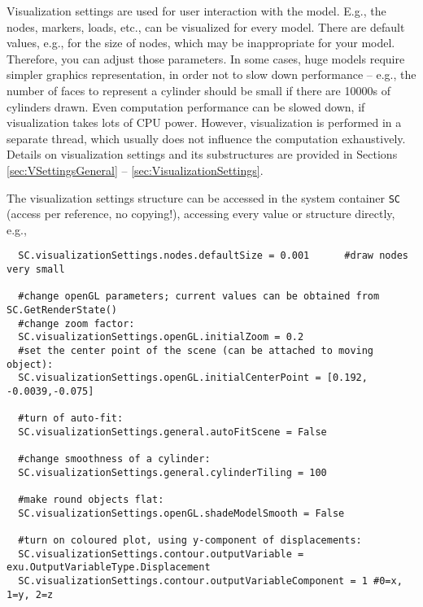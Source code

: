 %
Visualization settings are used for user interaction with the model. E.g., the nodes, markers, loads, etc., can be visualized for every model. There are default values, e.g., for the size of nodes, which may be inappropriate for your model. Therefore, you can adjust those parameters. In some cases, huge models require simpler graphics representation, in order not to slow down performance -- e.g., the number of faces to represent a cylinder should be small if there are 10000s of cylinders drawn. Even computation performance can be slowed down, if visualization takes lots of CPU power. However, visualization is performed in a separate thread, which usually does not influence the computation exhaustively.
Details on visualization settings and its substructures are provided in Sections \ref{sec:VSettingsGeneral} -- \ref{sec:VisualizationSettings}.

The visualization settings structure can be accessed in the system container \texttt{SC} (access per reference, no copying!), accessing every value or structure directly, e.g.,
\pythonstyle\begin{lstlisting}
  SC.visualizationSettings.nodes.defaultSize = 0.001      #draw nodes very small

  #change openGL parameters; current values can be obtained from SC.GetRenderState()
  #change zoom factor:
  SC.visualizationSettings.openGL.initialZoom = 0.2       
  #set the center point of the scene (can be attached to moving object):
  SC.visualizationSettings.openGL.initialCenterPoint = [0.192, -0.0039,-0.075]

  #turn of auto-fit:
  SC.visualizationSettings.general.autoFitScene = False

  #change smoothness of a cylinder:
  SC.visualizationSettings.general.cylinderTiling = 100
  
  #make round objects flat:
  SC.visualizationSettings.openGL.shadeModelSmooth = False

  #turn on coloured plot, using y-component of displacements:
  SC.visualizationSettings.contour.outputVariable = exu.OutputVariableType.Displacement
  SC.visualizationSettings.contour.outputVariableComponent = 1 #0=x, 1=y, 2=z
\end{lstlisting}

